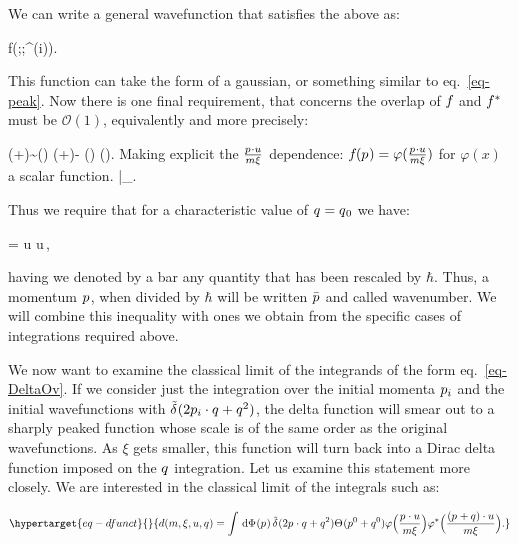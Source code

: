 \documentclass[
  11pt,
  a4paper,
  DIV=11,
  numbers=noendperiod,
  twoside]{scrreprt}
\let\[\relax \let\]\relax %
\DeclareRobustCommand{\[}{\begin{equation}}
\DeclareRobustCommand{\]}{\end{equation}}
\begin{document}
We can write a general wavefunction that satisfies the above as:

\[
f(\vert\cls{\vel[i]};\mass[i] ;\beta^{(i)}).
\]

This function can take the form of a gaussian, or something similar to
eq.~\ref{eq-peak}. Now there is one final requirement, that concerns the
overlap of \(\wf\) and \(\cwf\) must be \(\mathcal{O}(1)\), equivalently
and more precisely:

\[
\cwf(\emom+\tm)\sim \cwf(\emom) \implies \cwf(\emom+\tm)- \cwf(\emom) \implies \ct{\tm}\cwf(\emom).
\] Making explicit the \(\frac{\emom \cdot u }{m \xi}\) dependence:
\(\wf(\emom)=\varphi(\frac{\emom \cdot u }{m \xi})\) for \(\varphi(x)\)
a scalar function.
\[\implies {}\Bigr|_{}.\]

Thus we require that for a characteristic value of \(\tm=\co[0]{\tm}\)
we have:

\[
=\co[0]{\tw} \cdot u\iff \co[0]{\tw} \cdot u\,\wfwidth\ll \sqrt{ \xi},
\]

having we denoted by a bar any quantity that has been rescaled by
\(\hbar\). Thus, a momentum \(\emom\), when divided by \(\hbar\) will be
written \(\bar{\emom}\) and called wavenumber. We will combine this
inequality with ones we obtain from the specific cases of integrations
required above.

We now want to examine the classical limit of the integrands of the form
eq.~\ref{eq-DeltaOv}. If we consider just the integration over the
initial momenta \(\emom[i]\) and the initial wavefunctions with
\(\ndeltafn{2 \emom[i] \cdot \tm+\tm^2}\), the delta function will smear
out to a sharply peaked function whose scale is of the same order as the
original wavefunctions. As \(\xi\) gets smaller, this function will turn
back into a Dirac delta function imposed on the \(\tm\) integration. Let
us examine this statement more closely. We are interested in the
classical limit of the integrals such as:

\begin{equation}\protect\hypertarget{eq-dfunct}{}{
d(m,\xi,u,\tm)=\int \ddP{\emom} \ndeltafn{2 \emom \cdot \tm+\tm^2} \thetafn{\emom^0+\tm^0}\varphi \pa[\Big]{\frac{\emom \cdot u }{m \xi}}\varphi^*\pa[\Big]{\frac{(\emom+\tm) \cdot u }{m \xi}}.
}\label{eq-dfunct}\end{equation}
\end{document}
